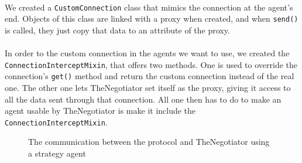 \paragraph*{}
We created a \texttt{CustomConnection} class that mimics the connection at the agent's end. Objects of this class are linked with a proxy when created, and when \texttt{send()} is called, they just copy that data to an attribute of the proxy.

\paragraph*{}
In order to  the custom connection in the agents we want to use, we created the \texttt{ConnectionInterceptMixin}, that offers two methods. One is used to override the connection's \texttt{get()} method and return the custom connection instead of the real one. The other one lets TheNegotiator set itself as the proxy, giving it access to all the data sent through that connection. All one then has to do to make an agent usable by TheNegotiator is make it include the \texttt{ConnectionInterceptMixin}.

\begin{figure}[H]
\centering
{}
\captionsetup{justification=centering}
\caption{The communication between the protocol and TheNegotiator using a strategy agent}
\label{fig:agent-agent_connection}
\end{figure}

